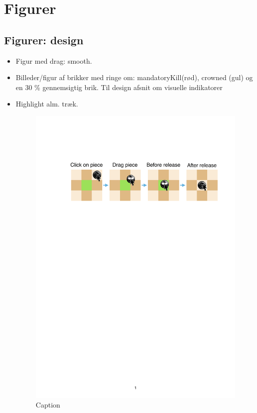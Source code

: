 \section{Figurer}
\subsection{Figurer: design}

\begin{itemize}
    \item Figur med drag: smooth.
    
    \item Billeder/figur af brikker med ringe om: mandatoryKill(rød), crowned (gul) og en 30 \% gennemsigtig brik. Til design afsnit om visuelle indikatorer
    
    \item Highlight alm. træk.
    
    \begin{figure}[H]
        \centering
        \includegraphics[width = \textwidth]{Figurer/MovePieceFigure}
        \caption{Caption}
        \label{fig:MovePieceFigure}
    \end{figure}


\end{itemize}
